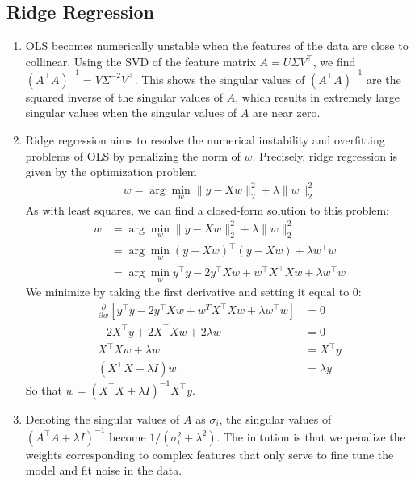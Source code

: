 \documentclass[10pt]{article}
\begin{document}
\begin{multicols}{2}
\begin{addmargin}[0.8em]{0.5em}
    \subsection{Ridge Regression}
    \begin{enumerate}[label=(\alph*)]
        \item OLS becomes numerically unstable when the features of the data are close to collinear. Using the SVD of the feature matrix $A=U\Sigma V^\top$, we find $(A^\top A)^{-1} = V\Sigma^{-2}V^\top$. This shows the singular values of $(A^\top A)^{-1}$ are the squared inverse of the singular values of $A$, which results in extremely large singular values when the singular values of $A$ are near zero.
        \item Ridge regression aims to resolve the numerical instability and overfitting problems of OLS by penalizing the norm of $w$. Precisely, ridge regression is given by the optimization problem
        \begin{align*}
        w = \arg\min_{w} \| y - X w \|_2^2 + \lambda \| w \|_2^2
        \end{align*}
        As with least squares, we can find a closed-form solution to this problem:
        \begin{align*}
        w &= \arg\min_{w} \| y - X w \|_2^2 + \lambda \|w\|_2^2 \\
        &= \arg\min_{w} (y - X w)^\top(y - X w) + \lambda w^\top w \\
        &= \arg\min_{w} y^\top y - 2y^\top X w + w^\top X^\top X w + \lambda w^\top w
        \end{align*}
        We minimize by taking the first derivative and setting it equal to 0:
        \begin{align*}
            \frac{\partial}{\partial w} \left[ y^\top y - 2y^\top X w + w^T X^\top X w + \lambda w^\top w \right] &= 0 \\
            -2X^\top y + 2X^\top X w + 2\lambda w &= 0 \\
            X^\top Xw + \lambda w &= X^\top y \\
            (X^\top X + \lambda I) w &= \lambda y 
        \end{align*}
        So that $w = (X^\top X + \lambda I)^{-1} X^\top y$.
        \item Denoting the singular values of $A$ as $\sigma_i$, the singular values of $(A^\top A + \lambda I)^{-1}$ become $1/(\sigma_i^2 + \lambda^2)$. The initution is that we penalize the weights corresponding to complex features that only serve to fine tune the model and fit noise in the data.
    \end{enumerate}
    

\end{addmargin}
\end{multicols}
\end{document}
